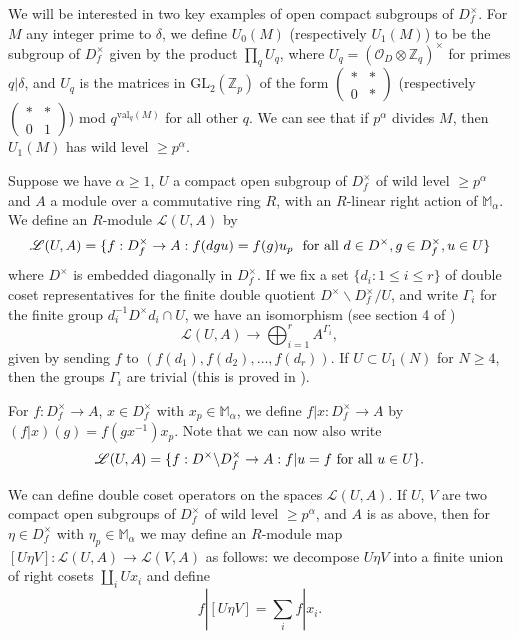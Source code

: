\documentclass[a4paper, notitlepage]{amsart}
\newcommand{\Z}{\ensuremath{\mathbb{Z}}\xspace}
\newcommand{\OO}{\ensuremath{\mathscr{O}}\xspace}
\begin{document}
We will be interested in two key examples of open compact subgroups of $D_f^\times$. For $M$ any integer prime to $\delta$, we define $U_0(M)$ (respectively $U_1(M)$) to be the subgroup of $D_f^\times$ given by the product $\prod_q U_q$, where $U_q = (\OO_D\otimes\Z_q)^\times$ for primes $q | \delta$, and $U_q$ is the matrices in $\mathrm{GL}_2(\Z_p)$ of the form $\begin{pmatrix}
\ast & \ast \\ 0 & \ast
\end{pmatrix}$ (respectively $\begin{pmatrix}
\ast & \ast \\ 0 & 1
\end{pmatrix}$) mod $q^{\mathrm{val}_q(M)}$ for all other $q$. We can see that if $p^\alpha$ divides $M$, then $U_1(M)$ has wild level $\geq p^\alpha$.

Suppose we have $\alpha \geq 1$, $U$ a compact open subgroup of $D_f^\times$ of wild level $\geq p^\alpha$ and $A$ a module over a commutative ring $R$, with an $R$-linear right action of $\mathbb{M}_\alpha$. We define an $R$-module $\mathscr{L}(U,A)$ by
$$\mathscr{L}(U,A)=\{f:D_f^\times \rightarrow A : f(dgu)=f(g)u_p\ \hbox{ for all }d \in D^\times, g\in D_f^\times, u \in U\}$$ where $D^\times$ is embedded diagonally in $D_f^\times$. If we fix a set $\{d_i : 1\leq i \leq r\}$ of double coset representatives for the finite double quotient $D^\times \backslash D_f^\times / U$, and write $\Gamma_i$ for the finite group $d_i^{-1}D^\times d_i \cap U$, we have an isomorphism (see section 4 of \cite{Bu1}) $$\mathscr{L}(U,A)\rightarrow \bigoplus_{i=1}^r A^{\Gamma_i},$$ given by sending $f$ to $(f(d_1),f(d_2),\ldots,f(d_r))$. If $U \subset U_1(N)$ for $N \ge 4$, then the groups $\Gamma_i$ are trivial (this is proved in \cite{DT}).

For $f : D_f^\times \rightarrow A$, $x\in D_f^\times$ with $x_p \in \mathbb{M}_\alpha$, we define $f|x : D_f^\times \rightarrow A$ by $(f|x)(g)=f(gx^{-1})x_p$. Note that we can now also write $$\mathscr{L}(U,A)=\{f:D^\times \backslash D_f^\times \rightarrow A : f|u=f \hbox{ for all }u \in U\}.$$

We can define double coset operators on the spaces $\mathscr{L}(U,A)$. If $U$, $V$ are two compact open subgroups of $D_f^\times$ of wild level $\geq p^\alpha$, and $A$ is as above, then for $\eta\in D_f^\times$ with $\eta_p \in \mathbb{M}_\alpha$ we may define an $R$-module map $[U\eta V]:\mathscr{L}(U,A) \rightarrow \mathscr{L}(V,A)$ as follows: we decompose $U\eta V$ into a finite union of right cosets $\coprod_i U x_i$ and define $$f|[U\eta V] = \sum_i f|x_i.$$
\end{document}
